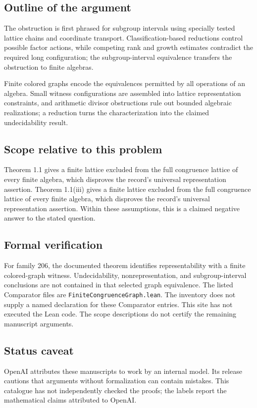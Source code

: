 \documentclass[11pt]{article}
\begin{document}
\subsection{Outline of the argument}
The obstruction is first phrased for subgroup intervals using specially tested lattice chains and coordinate transport. Classification-based reductions control possible factor actions, while competing rank and growth estimates contradict the required long configuration; the subgroup-interval equivalence transfers the obstruction to finite algebras.

Finite colored graphs encode the equivalences permitted by all operations of an algebra. Small witness configurations are assembled into lattice representation constraints, and arithmetic divisor obstructions rule out bounded algebraic realizations; a reduction turns the characterization into the claimed undecidability result.

\subsection{Scope relative to this problem}
Theorem 1.1 gives a finite lattice excluded from the full congruence lattice of every finite algebra, which disproves the record’s universal representation assertion. Theorem 1.1(iii) gives a finite lattice excluded from the full congruence lattice of every finite algebra, which disproves the record’s universal representation assertion. Within these assumptions, this is a claimed negative answer to the stated question.

\subsection{Formal verification}
For family 206, the documented theorem identifies representability with a finite colored-graph witness. Undecidability, nonrepresentation, and subgroup-interval conclusions are not contained in that selected graph equivalence. The listed Comparator files are \texttt{FiniteCongruenceGraph.lean}. The inventory does not supply a named declaration for these Comparator entries. This site has not executed the Lean code. The scope descriptions do not certify the remaining manuscript arguments.

\subsection{Status caveat}
OpenAI attributes these manuscripts to work by an internal model. Its release cautions that arguments without formalization can contain mistakes. This catalogue has not independently checked the proofs; the labels report the mathematical claims attributed to OpenAI.
\end{document}
